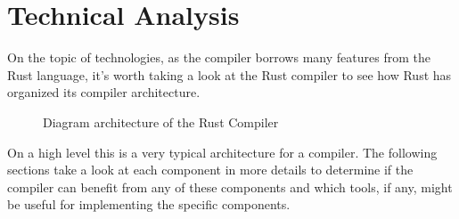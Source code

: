 \section{Technical Analysis}
\label{sec:TechAnalysis}

On the topic of technologies, as the \lang{} compiler borrows many features from the
Rust language, it's worth taking a look at the Rust compiler to see how Rust has
organized its compiler architecture. 

\begin{figure}[ht]
  \centering
  \caption{Diagram architecture of the Rust Compiler}
\end{figure}

On a high level this is a very typical architecture for a compiler\cite{GEEK}. The
following sections take a look at each component in more details to determine if the
\lang{} compiler can benefit from any of these components and which tools, if any,
might be useful for implementing the specific components.

